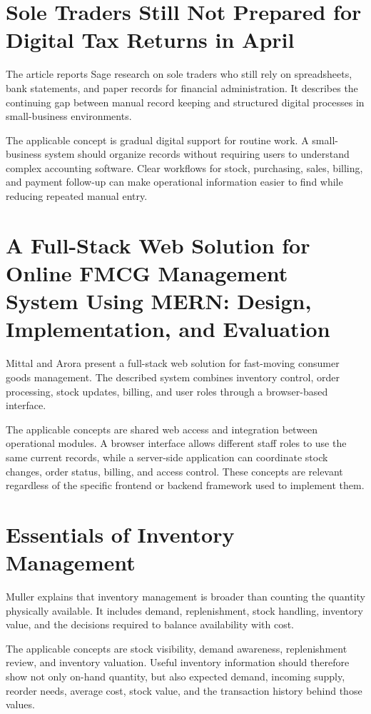 \section{Sole Traders Still Not Prepared for Digital Tax Returns in April \cite{times_sage_sole_traders_2025}}
The article reports Sage research on sole traders who still rely on spreadsheets, bank statements, and paper records for financial administration. It describes the continuing gap between manual record keeping and structured digital processes in small-business environments.

The applicable concept is gradual digital support for routine work. A small-business system should organize records without requiring users to understand complex accounting software. Clear workflows for stock, purchasing, sales, billing, and payment follow-up can make operational information easier to find while reducing repeated manual entry.

\section{A Full-Stack Web Solution for Online FMCG Management System Using MERN: Design, Implementation, and Evaluation \cite{paper_1}}
Mittal and Arora present a full-stack web solution for fast-moving consumer goods management. The described system combines inventory control, order processing, stock updates, billing, and user roles through a browser-based interface.

The applicable concepts are shared web access and integration between operational modules. A browser interface allows different staff roles to use the same current records, while a server-side application can coordinate stock changes, order status, billing, and access control. These concepts are relevant regardless of the specific frontend or backend framework used to implement them.

\section{Essentials of Inventory Management \cite{paper_2}}
Muller explains that inventory management is broader than counting the quantity physically available. It includes demand, replenishment, stock handling, inventory value, and the decisions required to balance availability with cost.

The applicable concepts are stock visibility, demand awareness, replenishment review, and inventory valuation. Useful inventory information should therefore show not only on-hand quantity, but also expected demand, incoming supply, reorder needs, average cost, stock value, and the transaction history behind those values.

